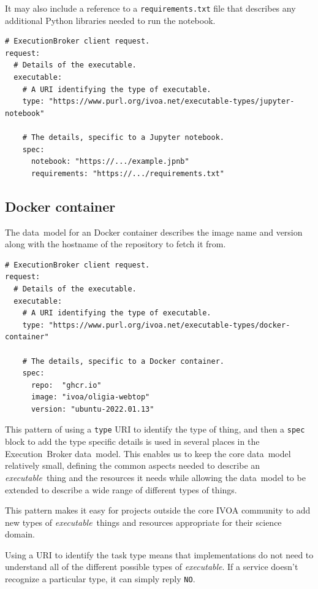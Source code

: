 \documentclass[11pt,a4paper]{ivoa}
\newcommand{\datamodel} {data~model}
\newcommand{\ivoa} {IVOA}
\newcommand{\executionbroker} {Execution~Broker}
\newcommand{\python} {Python}
\newcommand{\dockercontainer} {Docker container}
\newcommand{\codeword}[1] {\texttt{#1}}
\newcommand{\executable} {\textit{executable}}
\newcommand{\executablething} {\textit{executable}~thing}
\begin{document}
It may also include a reference to a \codeword{requirements.txt} file that describes any additional \python{}
libraries needed to run the notebook.
\begin{lstlisting}[]
# ExecutionBroker client request.
request:
  # Details of the executable.
  executable:
    # A URI identifying the type of executable.
    type: "https://www.purl.org/ivoa.net/executable-types/jupyter-notebook"

    # The details, specific to a Jupyter notebook.
    spec:
      notebook: "https://.../example.jpnb"
      requirements: "https://.../requirements.txt"
\end{lstlisting}

\subsection{\dockercontainer{}}
\label{dockercontainer}
The \datamodel{} for an \dockercontainer{} describes the image name and version
along with the hostname of the repository to fetch it from.

\begin{lstlisting}[]
# ExecutionBroker client request.
request:
  # Details of the executable.
  executable:
    # A URI identifying the type of executable.
    type: "https://www.purl.org/ivoa.net/executable-types/docker-container"

    # The details, specific to a Docker container.
    spec:
      repo:  "ghcr.io"
      image: "ivoa/oligia-webtop"
      version: "ubuntu-2022.01.13"
\end{lstlisting}

This pattern of using a \codeword{type} URI to identify the type of thing, and then a
\codeword{spec} block to add the type specific details is used in several places in the
\executionbroker{} \datamodel{}.
This enables us to keep the core \datamodel{} relatively small, defining the common aspects
needed to describe an \executablething{} and the resources it needs while allowing the
\datamodel{} to be extended to describe a wide range of different types of things.

This pattern makes it easy for projects outside the core \ivoa{} community to add new
types of \executablething{}s and resources appropriate for their science domain.

Using a URI to identify the task type means that implementations do not need to understand
all of the different possible types of \executable{}.
If a service doesn’t recognize a particular type, it can simply reply \codeword{NO}.
\end{document}
